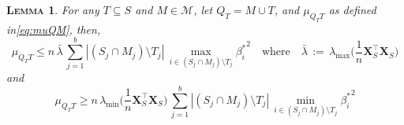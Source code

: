 \documentclass[bj,authoryear]{imsart}
\theoremstyle{plain}
\newtheorem{lem}[thm]{\textsc{Lemma}}
\newcommand{\M}{\mathcal{M}}
\newcommand{\bs}{\boldsymbol}
\begin{document}
\begin{lem}\label{lem:upperboundnoncentralgen}
    For any $T\subseteq S$ and $M\in \M$, let $Q_T=M\cup T$, and $\mu_{Q_T T}$ as defined in\eqref{eq:muQM}, then, 
    \begin{equation}\label{eq:upperbounnnnnd}
      \mu_{Q_TT} \leq n\,\bar{\lambda}\,\sum_{j=1}^b|(S_j\cap M_j )\setminus T_j|\,\max_{i\in (S_j\cap M_j )\setminus T_j}{\beta_{i}^*}^2 \quad \text{where}\quad \bar{\lambda}\,:=\,\lambda_{\max}\Big(\frac1n \bs X_{S}^\top\bs X_{S}\Big)  
    \end{equation}
    and
    \begin{equation}\label{eq:lowerbounnnnnd}
    \mu_{Q_TT} \geq n\,\lambda_{\min}\Big(\frac1n \bs X_{S}^\top\bs X_{S}\Big)\,\sum_{j=1}^b|(S_j\cap M_j )\setminus T_j|\,\min_{i\in (S_j\cap M_j )\setminus T_j}{\beta_{i}^*}^2
    \end{equation}
\end{lem}
\end{document}
